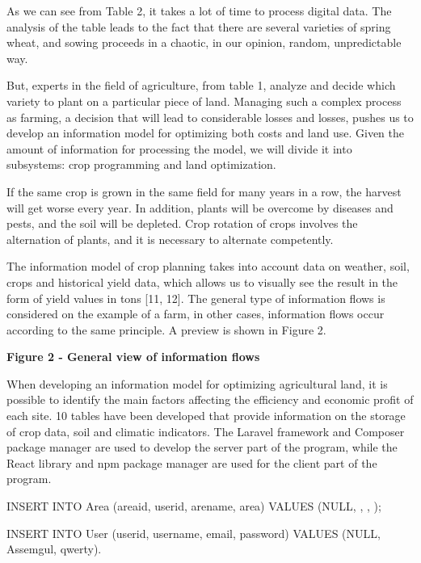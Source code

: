 As we can see from Table 2, it takes a lot of time to process digital
data. The analysis of the table leads to the fact that there are several
varieties of spring wheat, and sowing proceeds in a chaotic, in our
opinion, random, unpredictable way.

But, experts in the field of agriculture, from table 1, analyze and
decide which variety to plant on a particular piece of land. Managing
such a complex process as farming, a decision that will lead to
considerable losses and losses, pushes us to develop an information
model for optimizing both costs and land use. Given the amount of
information for processing the model, we will divide it into subsystems:
crop programming and land optimization.

If the same crop is grown in the same field for many years in a row, the
harvest will get worse every year. In addition, plants will be overcome
by diseases and pests, and the soil will be depleted. Crop rotation of
crops involves the alternation of plants, and it is necessary to
alternate competently.

The information model of crop planning takes into account data on
weather, soil, crops and historical yield data, which allows us to
visually see the result in the form of yield values in tons {[}11,
12{]}. The general type of information flows is considered on the
example of a farm, in other cases, information flows occur according to
the same principle. A preview is shown in Figure 2.

\textbf{Figure 2 - General view of information flows}

When developing an information model for optimizing agricultural land,
it is possible to identify the main factors affecting the efficiency and
economic profit of each site. 10 tables have been developed that provide
information on the storage of crop data, soil and climatic indicators.
The Laravel framework and Composer package manager are used to develop
the server part of the program, while the React library and npm package
manager are used for the client part of the program.

INSERT INTO Area (areaid, userid, arename, area) VALUES (NULL,
\textquotesingle, \textquotesingle,
\textquotesingle);

INSERT INTO User (userid, username, email, password) VALUES (NULL,
\textquotesingle Assemgul\textquotesingle,
\textquotesingle qwerty\textquotesingle).

